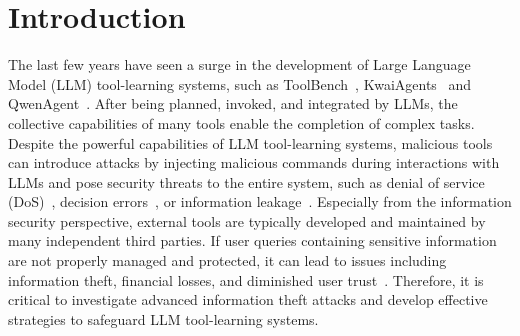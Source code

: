 \section{Introduction}





{The last few years have seen a surge in the development of Large Language Model (LLM) tool-learning systems, such as ToolBench~\cite{DBLP:journals/corr/abs-2304-08354}, KwaiAgents~\cite{DBLP:journals/corr/abs-2312-04889} and QwenAgent~\cite{DBLP:journals/corr/abs-2412-15115}. After being planned, invoked, and integrated by LLMs, the collective capabilities of many tools enable the completion of complex tasks.}
{Despite the powerful capabilities of LLM tool-learning systems,} 
malicious tools can introduce attacks by injecting malicious commands during interactions with LLMs and pose security threats to the entire system, such as denial of service (DoS)~\cite{DBLP:journals/corr/abs-2412-13879}, decision errors~\cite{DBLP:journals/corr/abs-2311-05232}, or information leakage~\cite{DBLP:journals/corr/abs-2409-11295}.
Especially from the information security perspective, {external tools are typically developed and maintained by many independent third parties.}
{If user queries containing sensitive information are not properly managed and protected, it can lead to issues including information theft, financial losses, and diminished user trust~\cite{article}.
Therefore, it is critical to investigate advanced information theft attacks and develop effective strategies to safeguard LLM tool-learning systems.}

